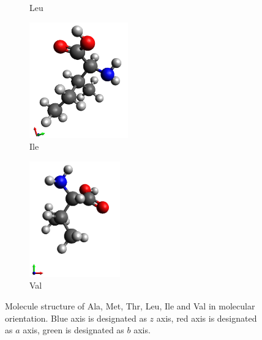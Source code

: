 \begin{figure}
\begin{subfigure}{.5\textwidth}
  \caption{Leu}
  \label{fig:sfig4}
\end{subfigure}
\begin{subfigure}{.5\textwidth}
  \centering
  \includegraphics[height=5cm]{Figures/Ile.png}
  \caption{Ile}
  \label{fig:sfig5}
\end{subfigure}
\begin{subfigure}{.5\textwidth}
  \centering
  \includegraphics[height=5cm]{Figures/Val.png}
  \caption{Val}
  \label{fig:sfig6}
\end{subfigure}
\caption{Molecule structure of Ala, Met, Thr, Leu, Ile and Val in molecular orientation. Blue axis is designated as $z$ axis, red axis is designated as $a$ axis, green is designated as $b$ axis.}
\label{fig:aminacids}
\end{figure}

